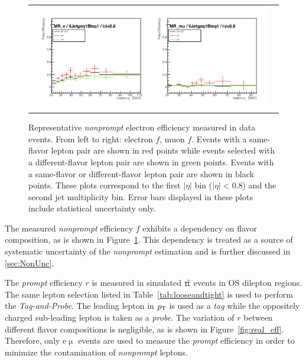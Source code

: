 \begin{figure}[tbh!]
 \begin{center}
 \begin{tabular}{c}
 \includegraphics[width=0.95\textwidth]{figures/Part3/Nonprompt/MR/fake_eff}
 \end{tabular}
 \caption{Representative \emph{nonprompt} electron efficiency measured in data events. From left to right: electron $f$, muon $f$. Events with a same-flavor lepton pair are shown in red points while events selected with a different-flavor lepton pair are shown in green points. Events with a same-flavor or different-flavor lepton pair are shown in black points. These plots correspond to the first $|\eta|$ bin ($|\eta|<$0.8) and the second jet multiplicity bin. Error bars displayed in these plots include statistical uncertainty only. }
 \label{fig:fake_eff}
 \end{center}
\end{figure}

The measured \emph{nonprompt} efficiency $f$ exhibits a dependency on flavor composition, as is shown in Figure~\ref{fig:fake_eff}. This dependency is treated as a source of systematic uncertainty of the \emph{nonprompt} estimation and is further discussed in \autoref{sec:NonUnc}.

The \emph{prompt} efficiency $r$ is measured in simulated $\textsf{t}\overline{\textsf{t}}$ events in \ac{OS} dilepton regions. The same lepton selection listed in Table~\ref{tab:looseandtight} is used to perform the \emph{Tag-and-Probe}. The leading lepton in $p_{\textsf{T}}$ is used as a \emph{tag} while the oppositely charged sub-leading lepton is taken as a \emph{probe}. The variation of $r$ between different flavor compositions is negligible, as is shown in Figure~\ref{fig:real_eff}. Therefore, only e$\upmu$ events are used to measure the \emph{prompt} efficiency in order to minimize the contamination of \emph{nonprompt} leptons.

